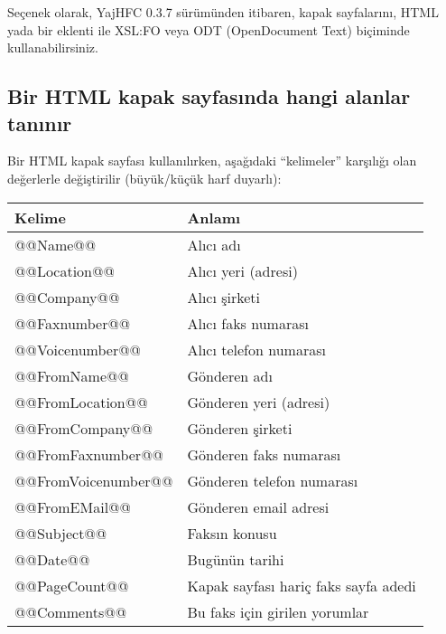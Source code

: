 \documentclass[a4paper,10pt]{scrartcl}
\begin{document}
Seçenek olarak, YajHFC 0.3.7 sürümünden itibaren, kapak sayfalarını, HTML yada bir eklenti ile XSL:FO veya ODT (OpenDocument Text) biçiminde kullanabilirsiniz.

 \subsection{Bir HTML kapak sayfasında hangi alanlar tanınır}
Bir HTML kapak sayfası kullanılırken, aşağıdaki ``kelimeler'' karşılığı olan değerlerle değiştirilir (büyük/küçük harf duyarlı):

\begin{center}
\begin{tabular}{|l|l|}
\hline
\bfseries Kelime & \bfseries Anlamı \\
\hline\hline
\ttfamily @@Name@@ & Alıcı adı \\\hline
\ttfamily @@Location@@ & Alıcı yeri (adresi) \\\hline
\ttfamily @@Company@@ & Alıcı şirketi \\\hline
\ttfamily @@Faxnumber@@ & Alıcı faks numarası \\\hline
\ttfamily @@Voicenumber@@ & Alıcı telefon numarası \\\hline
\ttfamily @@FromName@@ & Gönderen adı \\\hline
\ttfamily @@FromLocation@@ & Gönderen yeri (adresi) \\\hline
\ttfamily @@FromCompany@@ & Gönderen şirketi \\\hline
\ttfamily @@FromFaxnumber@@ & Gönderen faks numarası \\\hline
\ttfamily @@FromVoicenumber@@ & Gönderen telefon numarası \\\hline
\ttfamily @@FromEMail@@ & Gönderen email adresi \\\hline
\ttfamily @@Subject@@ & Faksın konusu \\\hline
\ttfamily @@Date@@ & Bugünün tarihi \\\hline
\ttfamily @@PageCount@@ & Kapak sayfası hariç faks sayfa adedi \\\hline
\ttfamily @@Comments@@ & Bu faks için girilen yorumlar \\\hline
\end{tabular}
\end{center}
\end{document}
